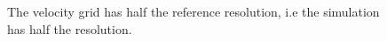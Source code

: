 \begin{figure}[h!]
\centering
{}
\caption
{
\label{fig:fire2}
The velocity grid has half the reference resolution, i.e the simulation has half the resolution.
}
\end{figure} 

